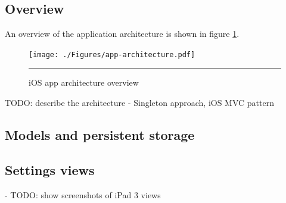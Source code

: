 \subsection{Overview}
An overview of the application architecture is shown in figure \ref{fig:apparchitecture}.

\begin{figure}[t]
	\centering
		\texttt{[image: ./Figures/app-architecture.pdf]}
		\rule{35em}{1pt}
	\caption[App architecture]{iOS app architecture overview}
	\label{fig:apparchitecture}
\end{figure}

TODO: describe the architecture
- Singleton approach, iOS MVC pattern

\subsection{Models and persistent storage}

\subsection{Settings views}
- TODO: show screenshots of iPad 3 views









